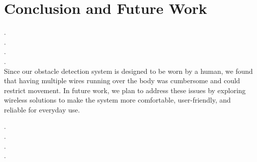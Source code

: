 \section{Conclusion and Future Work}

.\\.\\.\\.\\
Since our obstacle detection system is designed to be worn by a human, we found that having multiple wires running over the body was cumbersome and could restrict movement. In future work, we plan to address these issues by exploring wireless solutions to make the system more comfortable, user-friendly, and reliable for everyday use.

.\\.\\.\\.\\